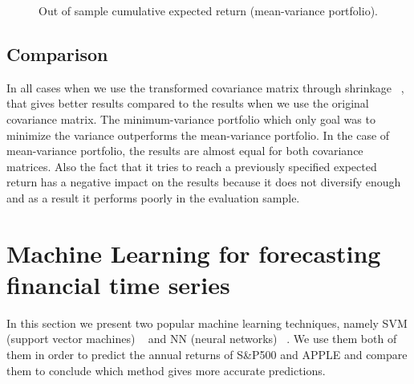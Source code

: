 \documentclass[letterpaper,12pt]{article}
\begin{document}
\begin{figure}
  \centering
  \caption{Out of sample cumulative expected return (mean-variance portfolio).\label{fig:fig_mean_variance_cum}}
\end{figure}

\subsection{Comparison}
In all cases when we use the transformed covariance matrix through shrinkage ~\cite{LW}, that gives better results compared to the results when we use the original covariance matrix. The minimum-variance portfolio which only goal was to minimize the variance outperforms the mean-variance portfolio. In the case of mean-variance portfolio, the results are almost equal for both covariance matrices. Also the fact that it tries to reach a previously specified expected return has a negative impact on the results because it does not diversify enough and as a result it performs poorly in the evaluation sample.

\section{Machine Learning for forecasting financial time series}

In this section we present two popular machine learning techniques, namely SVM (support vector machines) ~\cite{SVM} and NN (neural networks) ~\cite{NN}. We use them both of them in order to predict the annual returns of S\&P500 and APPLE and compare them to conclude which method gives more accurate predictions.
\end{document}
